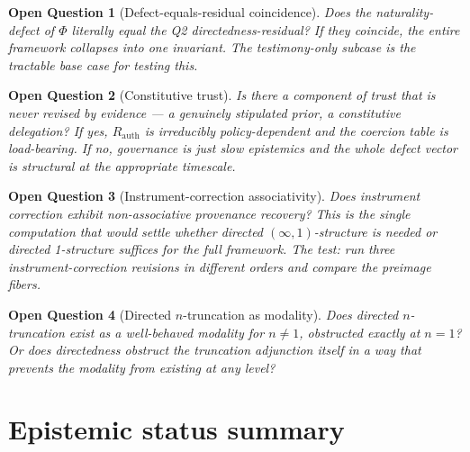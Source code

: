 \documentclass[11pt]{article}
\newtheorem{openquestion}{Open Question}
\newcommand{\Rauth}{R_{\mathrm{auth}}}
\begin{document}
\begin{openquestion}[Defect-equals-residual coincidence]
\label{oq:coincidence}
Does the naturality-defect of $\Phi$ literally equal the Q2 directedness-residual? If they
coincide, the entire framework collapses into one invariant. The testimony-only subcase is the
tractable base case for testing this.
\end{openquestion}

\begin{openquestion}[Constitutive trust]
\label{oq:constitutive-trust}
Is there a component of trust that is never revised by evidence --- a genuinely stipulated
prior, a constitutive delegation? If yes, $\Rauth$ is irreducibly policy-dependent and the
coercion table is load-bearing. If no, governance is just slow epistemics and the whole defect
vector is structural at the appropriate timescale.
\end{openquestion}

\begin{openquestion}[Instrument-correction associativity]
\label{oq:instrument-assoc}
Does instrument correction exhibit non-associative provenance recovery? This is the single
computation that would settle whether directed $(\infty,1)$-structure is needed or directed
1-structure suffices for the full framework. The test: run three instrument-correction
revisions in different orders and compare the preimage fibers.
\end{openquestion}

\begin{openquestion}[Directed $n$-truncation as modality]
\label{oq:directed-truncation}
Does directed $n$-truncation exist as a well-behaved modality for $n \neq 1$, obstructed
exactly at $n = 1$? Or does directedness obstruct the truncation adjunction itself in a way
that prevents the modality from existing at any level?
\end{openquestion}

\section{Epistemic status summary}
\end{document}
